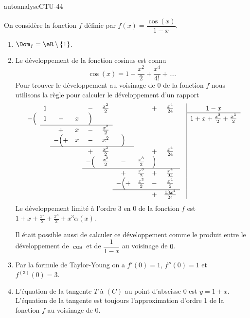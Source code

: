 
\begin{corrige}{autoanalyseCTU-44}



On considère la fonction $f$ définie par $f(x)=\dfrac{\cos (x)}{1-x}$.
\begin{enumerate}
\item $\Dom_f = \eR\setminus\{1\}$.
\item Le développement de la fonction cosinus est connu
  \begin{equation*}
    \cos(x) = 1-\frac{x^2}{2} + \frac{x^4}{4!} + \ldots.
  \end{equation*}
Pour trouver le développement au voisinage de $0$ de la fonction $f$ nous utilisons la règle pour calculer le développement d'un rapport
\begin{equation*}
        \begin{array}[]{ccccccccccc|c}
            &1&&&-&\frac{x^2}{ 2 }&&&+&\frac{x^4}{ 24 }& &1-x \\
            \cline{12-12}
            -\Big( &1&-&x&\Big)&&&& && &1+x+\frac{x^2}{2}+\frac{x^3}{2}\\
            \cline{2-6}
            & &+ &x&-&\frac{x^2}{ 2 }&&& & & &  \\
            &&-\Big( +&x&-&x^2&\Big)&& & & \\
            \cline{3-7}
            & & & & +&\frac{ x^2}{ 2 }&&&+&\frac{x^4}{ 24 }& &  \\
            & & &  &-\Big(  &\frac{ x^2 }{ 2 }&-&\frac{x^3}{ 2 }&\Big)& && \\
            \cline{5-10}
            & & & & & &+ &\frac{x^3}{2} &+&\frac{x^4}{ 24 } && \\
            & & & & & &- \Big( +&\frac{x^3}{2} &-&\frac{x^4}{ 2 } && \\
            \cline{7-10}
            & & & & & &&&+&\frac{13x^4}{ 24 } && \\
        \end{array}
    \end{equation*}
Le développement limité  à l'ordre 3 en 0 de la fonction $f$ est $\displaystyle 1+x+\frac{x^2}{2}+\frac{x^3}{2} + x^3\alpha(x)$.
\begin{remark}
  Il était possible aussi de calculer ce développement comme le produit entre le développement de $\cos$ et de $\dfrac{1}{1-x}$ au voisinage de $0$. 
\end{remark}
\item Par la formule de Taylor-Young on a $f'(0) = 1$, $f''(0) = 1$ et $f^{(3)}(0) = 3$.
\item L'équation de la tangente  $T$ à $(C)$ au point d'abscisse 0 est $y = 1+x$. L'équation de la tangente est toujours l'approximation d'ordre 1 de la fonction $f$ au voisinage de $0$.


\end{enumerate}

\end{corrige}   
